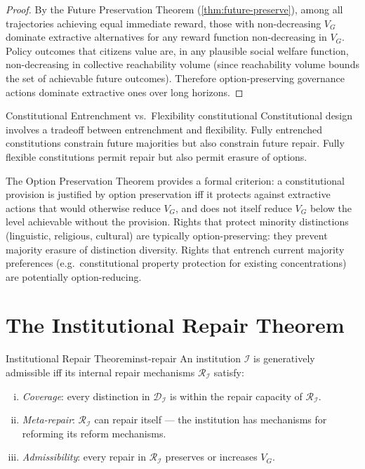 \documentclass[12pt,twoside,openright]{book}
\begin{document}
\begin{proof}
  By the Future Preservation Theorem
  (\cref{thm:future-preserve}), among all trajectories
  achieving equal immediate reward, those with
  non-decreasing $V_G$ dominate extractive alternatives
  for any reward function non-decreasing in $V_G$.
  Policy outcomes that citizens value are, in any
  plausible social welfare function, non-decreasing
  in collective reachability volume (since reachability
  volume bounds the set of achievable future outcomes).
  Therefore option-preserving governance actions
  dominate extractive ones over long horizons.
\end{proof}

\begin{example}{Constitutional Entrenchment vs.\ Flexibility}%
  {constitutional}
  Constitutional design involves a tradeoff between
  entrenchment and flexibility.
  Fully entrenched constitutions constrain future
  majorities but also constrain future repair.
  Fully flexible constitutions permit repair but also
  permit erasure of options.

  The Option Preservation Theorem provides a formal
  criterion: a constitutional provision is justified
  by option preservation iff it protects against
  extractive actions that would otherwise reduce $V_G$,
  and does not itself reduce $V_G$ below the level
  achievable without the provision.
  Rights that protect minority distinctions (linguistic,
  religious, cultural) are typically option-preserving:
  they prevent majority erasure of distinction diversity.
  Rights that entrench current majority preferences
  (e.g.\ constitutional property protection for
  existing concentrations) are potentially option-reducing.
\end{example}

\section{The Institutional Repair Theorem}

\begin{theorem}{Institutional Repair Theorem}{inst-repair}
  An institution $\mathcal{I}$ is generatively
  admissible iff its internal repair mechanisms
  $\mathcal{R}_\mathcal{I}$ satisfy:
  \begin{enumerate}[(i)]
    \item \emph{Coverage}: every distinction in
          $\mathcal{D}_\mathcal{I}$ is within the
          repair capacity of $\mathcal{R}_\mathcal{I}$.
    \item \emph{Meta-repair}: $\mathcal{R}_\mathcal{I}$
          can repair itself — the institution has
          mechanisms for reforming its reform mechanisms.
    \item \emph{Admissibility}: every repair in
          $\mathcal{R}_\mathcal{I}$ preserves or
          increases $V_G$.
  \end{enumerate}
\end{theorem}
\end{document}

